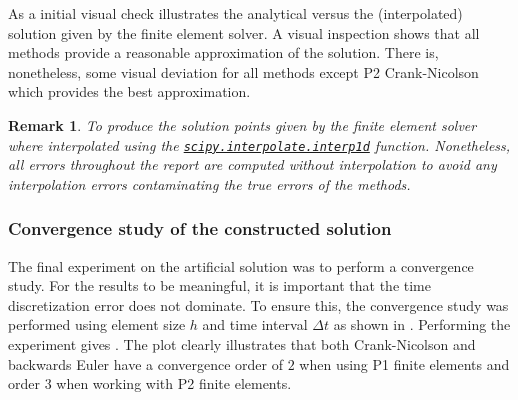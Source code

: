 \documentclass{article}
\newtheorem{remark}{Remark}[section]
\begin{document}
As a initial visual check  illustrates the analytical versus the (interpolated) solution given by the finite element solver. A visual inspection shows that all methods provide a reasonable approximation of the solution. There is, nonetheless, some visual deviation for all methods except P2 Crank-Nicolson which provides the best approximation.

\begin{remark}
    To produce  the solution points given by the finite element solver where interpolated using the \href{https://docs.scipy.org/doc/scipy/reference/generated/scipy.interpolate.interp1d.html}{\texttt{scipy.interpolate.interp1d}} function. Nonetheless, all errors throughout the report are computed without interpolation to avoid any interpolation errors contaminating the true errors of the methods.
\end{remark}



\subsubsection{Convergence study of the constructed solution}
The final experiment on the artificial solution was to perform a convergence study. For the results to be meaningful, it is important that the time discretization error does not dominate. To ensure this, the convergence study was performed using element size $h$ and time interval $\Delta t$ as shown in . Performing the experiment gives . The plot clearly illustrates that both Crank-Nicolson and backwards Euler have a convergence order of $2$ when using P1 finite elements and order $3$ when working with P2 finite elements. \\
\end{document}
